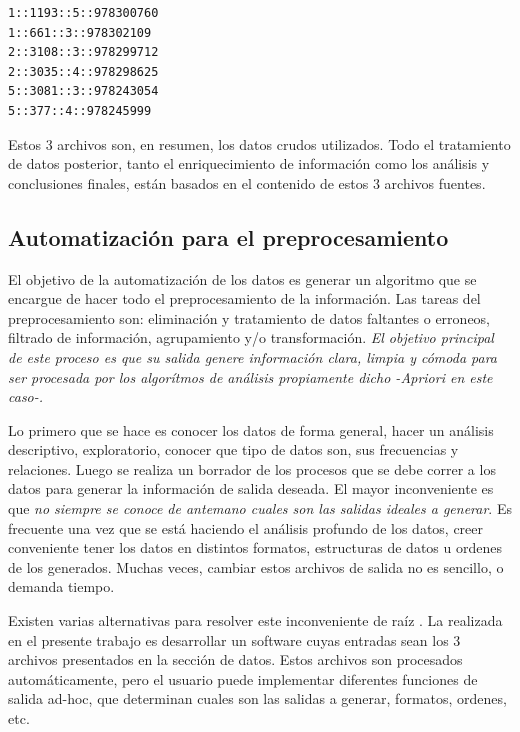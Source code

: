 \documentclass[journal]{IEEEtran}
\begin{document}
\begin{enumerate}
\begin{itemize}
        \begin{lstlisting}[frame=single,breaklines=true]
1::1193::5::978300760
1::661::3::978302109
2::3108::3::978299712
2::3035::4::978298625
5::3081::3::978243054
5::377::4::978245999
        \end{lstlisting}
    \end{itemize}

\end{enumerate}

Estos 3 archivos son, en resumen, los datos crudos utilizados. 
Todo el tratamiento de datos posterior, tanto el enriquecimiento de información como los
análisis y conclusiones finales, están basados en el contenido de estos 3 archivos
fuentes.

\subsection{Automatización para el preprocesamiento}
El objetivo de la automatización de los datos es generar un algoritmo que se encargue
de hacer todo el preprocesamiento de la información. Las tareas del preprocesamiento
son: eliminación  y tratamiento  de datos faltantes o erroneos, filtrado de información,
agrupamiento y/o transformación.
\emph{El objetivo principal de este proceso es que su salida genere información clara, limpia y cómoda
para ser procesada por los algorítmos de análisis propiamente dicho -Apriori en este caso-.}

Lo primero que se hace es conocer los datos de forma general, hacer un análisis descriptivo,
exploratorio, conocer que tipo de datos son, sus frecuencias y relaciones. Luego se realiza un
borrador de los procesos que se debe correr a los datos para generar la información de salida 
deseada. El mayor inconveniente es que \emph{no siempre se conoce de antemano cuales son las
salidas ideales a generar}. Es frecuente una vez que se está haciendo el análisis profundo
de los datos, creer conveniente tener los datos en distintos formatos, estructuras de
datos u ordenes de los generados. Muchas veces, cambiar estos archivos de salida no 
es sencillo, o demanda tiempo.

Existen varias alternativas para resolver este inconveniente de raíz
. La realizada en el presente
trabajo es desarrollar un software cuyas entradas sean los 3 archivos presentados en 
la sección de datos. Estos archivos son procesados automáticamente, pero el usuario
puede implementar diferentes funciones de salida ad-hoc, que determinan cuales son
las salidas a generar, formatos, ordenes, etc.
\end{document}
